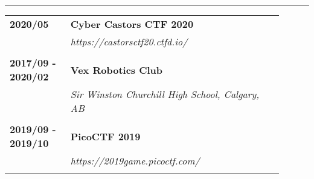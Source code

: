 \documentclass[letterpaper]{article}
\newcommand{\horizontalLine}{%
    \rule{\linewidth}{0.4pt}
    \vspace{1ex}
}
\begin{document}
        \horizontalLine

        \begin{tabular}{p{0.2\linewidth} p{0.7\linewidth}} 
            \textbf{2020/05} & \large\textbf{Cyber Castors CTF 2020} \\
            & \emph{https://castorsctf20.ctfd.io/} \\
            \\
            \textbf{2017/09 - 2020/02} & \large\textbf{Vex Robotics Club} \\
            & \emph{Sir Winston Churchill High School, Calgary, AB} \\
            \\
            \textbf{2019/09 - 2019/10} & \large\textbf{PicoCTF 2019} \\
            & \emph{https://2019game.picoctf.com/} \\
            \\
        \end{tabular}
\end{document}
